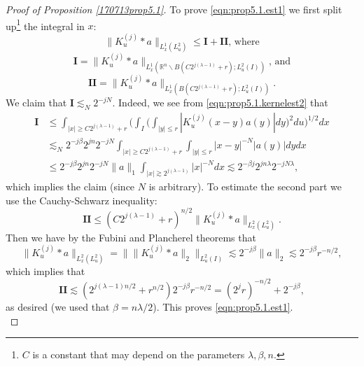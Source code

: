 \documentclass[12pt,leqno]{amsart}
\def\R{\mathbb{R}}
\theoremstyle{plain}
\numberwithin{equation}{section}
\begin{document}
\begin{proof}[Proof of Proposition \ref{170713prop5.1}]
To prove \eqref{eqn:prop5.1.est1} we first split up\footnote{$C$ is a constant that may depend on the parameters $\lambda,\beta,n$.}
 the integral in $x$:
\[ \| K_u^{(j)} * a\|_{L^1_x(L^2_u)}\le \mathbf{I} + \mathbf{II},\,\text{where}\]
\[ \mathbf{I} = \| K_u^{(j)} * a\|_{L^1_x(\R^n\backslash B(C2^{j(\lambda-1)}+r);L^2_u(I))} ,\,\text{and}\]
\[ \mathbf{II} = \| K_u^{(j)} * a\|_{L^1_x(B(C2^{j(\lambda-1)}+r);L^2_u(I))}. \]
We claim that $\mathbf{I}\lesssim_N 2^{-jN}$. Indeed, we see from \eqref{eqn:prop5.1.kernelest2} that
\begin{align*}
\mathbf{I} &\le \int_{|x|\ge C2^{j(\lambda-1)}+r} \Big(\int_I \Big( \int_{|y|\le r} |K_u^{(j)}(x-y) a(y)| dy \Big)^2 du \Big)^{1/2} dx\\
& \lesssim_N 2^{-j\beta} 2^{jn} 2^{-jN} \int_{|x|\ge C2^{j(\lambda-1)}+r} \int_{|y|\le r} |x-y|^{-N} |a(y)| dy dx \\
& \le 2^{-j\beta} 2^{jn} 2^{-jN} \|a\|_1 \int_{|x|\gtrsim 2^{j(\lambda-1)}} |x|^{-N} dx \lesssim 2^{-\beta j} 2^{jn\lambda} 2^{-jN\lambda},
\end{align*}
which implies the claim (since $N$ is arbitrary). To estimate the second part we use the Cauchy-Schwarz inequality:
\[ \mathbf{II} \le (C2^{j(\lambda-1)}+r)^{n/2} \|K_u^{(j)}*a\|_{L^2_x(L^2_u)}.\]
Then we have by the Fubini and Plancherel theorems that
\[\|K_u^{(j)}*a\|_{L^2_x(L^2_u)} = \Big\| \|K_u^{(j)}*a\|_2 \Big\|_{L^2_u(I)}\lesssim 2^{-j\beta} \|a\|_2 \lesssim 2^{-j\beta} r^{-n/2},\]
which implies that
\[ \mathbf{II} \lesssim (2^{j(\lambda-1)n/2} + r^{n/2}) 2^{-j\beta} r^{-n/2}=(2^j r)^{-n/2} + 2^{-j\beta},\]
as desired (we used that $\beta=n\lambda/2$). This proves \eqref{eqn:prop5.1.est1}.\\


\end{proof}
\end{document}
